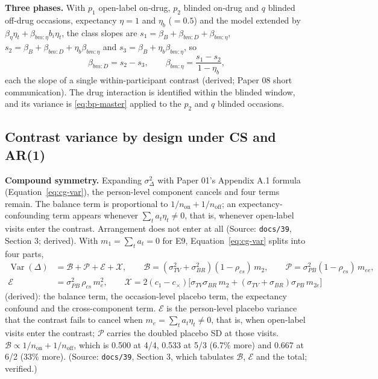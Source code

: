 \documentclass[11pt]{article}
\newcommand{\code}[1]{\texttt{#1}}
\begin{document}
\textbf{Three phases.} With $p_1$ open-label on-drug, $p_2$ blinded
on-drug and $q$ blinded off-drug occasions, expectancy $\eta = 1$ and
$\eta_b$ ($= 0.5$) and the model extended by $\beta_\eta\eta_t +
\beta_{bm:\eta}b_i\eta_t$, the class slopes are $s_1 = \beta_B +
\beta_{bm:D} + \beta_{bm:\eta}$, $s_2 = \beta_B + \beta_{bm:D} +
\eta_b\beta_{bm:\eta}$ and $s_3 = \beta_B + \eta_b\beta_{bm:\eta}$, so
\begin{equation}
\beta_{bm:D} = s_2 - s_3, \qquad
\beta_{bm:\eta} = \frac{s_1 - s_2}{1 - \eta_b},
\label{eq:bp-threephase}
\end{equation}
each the slope of a single within-participant contrast (derived; Paper
08 short communication). The drug interaction is identified within the
blinded window, and its variance is \eqref{eq:bp-master} applied to the
$p_2$ and $q$ blinded occasions.

\subsection{Contrast variance by design under CS and AR(1)}
\label{sec:invf-parts}

\textbf{Compound symmetry.} Expanding $\sigma_\Delta^2$ with Paper 01's
Appendix A.1 formula (Equation~\eqref{eq:cg-var}), the person-level
component cancels and four terms remain. The balance term is
proportional to $1/n_{\text{on}} + 1/n_{\text{off}}$; an
expectancy-confounding term appears whenever $\sum_t a_t\eta_t \ne 0$,
that is, whenever open-label visits enter the contrast. Arrangement
does not enter at all (Source: \code{docs/39}, Section 3; derived).
With $m_1 = \sum_t a_t = 0$ for E9, Equation~\eqref{eq:cg-var} splits
into four parts,
\begin{equation}
\begin{aligned}
\operatorname{Var}(\Delta) &= \mathcal B + \mathcal P + \mathcal E
  + \mathcal X, \qquad
\mathcal B = (\sigma_{TV}^2 + \sigma_{BR}^2)(1-\rho_{cs})\,m_2, \qquad
\mathcal P = \sigma_{PB}^2(1-\rho_{cs})\,m_{ee}, \\
\mathcal E &= \sigma_{PB}^2\,\rho_{cs}\,m_e^2, \qquad
\mathcal X = 2(c_1 - c_\times)\big[\sigma_{TV}\sigma_{BR}\,m_2
  + (\sigma_{TV} + \sigma_{BR})\sigma_{PB}\,m_{2e}\big]
\end{aligned}
\label{eq:invf-parts}
\end{equation}
(derived): the balance term, the occasion-level placebo term, the
expectancy confound and the cross-component term. $\mathcal E$ is the
person-level placebo variance that the contrast fails to cancel when
$m_e = \sum_t a_t\eta_t \ne 0$, that is, when open-label visits enter
the contrast; $\mathcal P$ carries the doubled placebo SD at those
visits. $\mathcal B \propto 1/n_{\text{on}} + 1/n_{\text{off}}$, which is
0.500 at 4/4, 0.533 at 5/3 (6.7\% more) and 0.667 at 6/2 (33\% more).
(Source: \code{docs/39}, Section 3, which tabulates $\mathcal B$,
$\mathcal E$ and the total; verified.)
\end{document}
